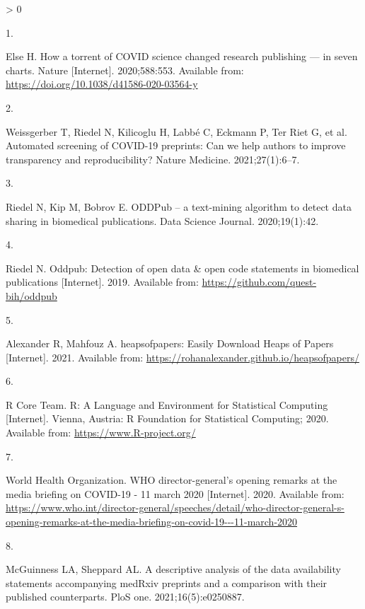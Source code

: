 \documentclass[
]{article}
\newlength{\cslhangindent}
\newlength{\csllabelwidth}
\newenvironment{CSLReferences}[2] %
 {%
  \setlength{\parindent}{0pt}
  \ifodd #1 \everypar{\setlength{\hangindent}{\cslhangindent}}\ignorespaces\fi
  \ifnum #2 > 0
  \setlength{\parskip}{#2\baselineskip}
  \fi
 }%
 {}
\newcommand{\CSLLeftMargin}[1]{\parbox[t]{\csllabelwidth}{#1}}
\newcommand{\CSLRightInline}[1]{\parbox[t]{\linewidth - \csllabelwidth}{#1}\break}
\begin{document}
\hypertarget{refs}{}
\begin{CSLReferences}{0}{0}
\leavevmode\hypertarget{ref-else2020}{}%
\CSLLeftMargin{1. }
\CSLRightInline{Else H. How a torrent of COVID science changed research publishing --- in seven charts. Nature {[}Internet{]}. 2020;588:553. Available from: \url{https://doi.org/10.1038/d41586-020-03564-y}}

\leavevmode\hypertarget{ref-weissgerber2021automated}{}%
\CSLLeftMargin{2. }
\CSLRightInline{Weissgerber T, Riedel N, Kilicoglu H, Labbé C, Eckmann P, Ter Riet G, et al. Automated screening of COVID-19 preprints: Can we help authors to improve transparency and reproducibility? Nature Medicine. 2021;27(1):6--7. }

\leavevmode\hypertarget{ref-citePDDPub}{}%
\CSLLeftMargin{3. }
\CSLRightInline{Riedel N, Kip M, Bobrov E. ODDPub -- a text-mining algorithm to detect data sharing in biomedical publications. Data Science Journal. 2020;19(1):42. }

\leavevmode\hypertarget{ref-citeODDPubpackage}{}%
\CSLLeftMargin{4. }
\CSLRightInline{Riedel N. Oddpub: Detection of open data \& open code statements in biomedical publications {[}Internet{]}. 2019. Available from: \url{https://github.com/quest-bih/oddpub}}

\leavevmode\hypertarget{ref-citealexandermafouz}{}%
\CSLLeftMargin{5. }
\CSLRightInline{Alexander R, Mahfouz A. {heapsofpapers: Easily Download Heaps of Papers} {[}Internet{]}. 2021. Available from: \url{https://rohanalexander.github.io/heapsofpapers/}}

\leavevmode\hypertarget{ref-citeR}{}%
\CSLLeftMargin{6. }
\CSLRightInline{R Core Team. {R: A Language and Environment for Statistical Computing} {[}Internet{]}. Vienna, Austria: R Foundation for Statistical Computing; 2020. Available from: \url{https://www.R-project.org/}}

\leavevmode\hypertarget{ref-citeWHOtimeline}{}%
\CSLLeftMargin{7. }
\CSLRightInline{World Health Organization. WHO director-general's opening remarks at the media briefing on COVID-19 - 11 march 2020 {[}Internet{]}. 2020. Available from: \url{https://www.who.int/director-general/speeches/detail/who-director-general-s-opening-remarks-at-the-media-briefing-on-covid-19---11-march-2020}}

\leavevmode\hypertarget{ref-mcguinness2021descriptive}{}%
\CSLLeftMargin{8. }
\CSLRightInline{McGuinness LA, Sheppard AL. A descriptive analysis of the data availability statements accompanying medRxiv preprints and a comparison with their published counterparts. PloS one. 2021;16(5):e0250887. }


\end{CSLReferences}
\end{document}
